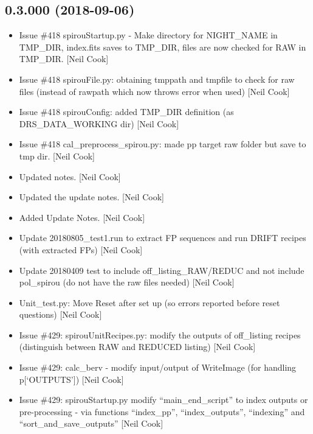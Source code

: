 \documentclass[a4paper,10pt,english]{report}
\begin{document}
\subsection{0.3.000 (2018-09-06)}
\label{\detokenize{misc/changelog:id332}}\begin{itemize}
\item {} 
Issue \#418 spirouStartup.py - Make directory for NIGHT\_NAME in
TMP\_DIR, index.fits saves to TMP\_DIR, files are now checked for RAW in
TMP\_DIR. {[}Neil Cook{]}

\item {} 
Issue \#418 spirouFile.py: obtaining tmppath and tmpfile to check for
raw files (instead of rawpath which now throws error when used) {[}Neil
Cook{]}

\item {} 
Issue \#418 spirouConfig: added TMP\_DIR definition (as DRS\_DATA\_WORKING
dir) {[}Neil Cook{]}

\item {} 
Issue \#418 cal\_preprocess\_spirou.py: made pp target raw folder but
save to tmp dir. {[}Neil Cook{]}

\item {} 
Updated notes. {[}Neil Cook{]}

\item {} 
Updated the update notes. {[}Neil Cook{]}

\item {} 
Added Update Notes. {[}Neil Cook{]}

\item {} 
Update 20180805\_test1.run to extract FP sequences and run DRIFT
recipes (with extracted FPs) {[}Neil Cook{]}

\item {} 
Update 20180409 test to include off\_listing\_RAW/REDUC and not include
pol\_spirou (do not have the raw files needed) {[}Neil Cook{]}

\item {} 
Unit\_test.py: Move Reset after set up (so errors reported before reset
questions) {[}Neil Cook{]}

\item {} 
Issue \#429: spirouUnitRecipes.py: modify the outputs of off\_listing
recipes (distinguish between RAW and REDUCED listing) {[}Neil Cook{]}

\item {} 
Issue \#429: calc\_berv - modify input/output of WriteImage (for
handling p{[}‘OUTPUTS’{]}) {[}Neil Cook{]}

\item {} 
Issue \#429: spirouStartup.py modify “main\_end\_script” to index outputs
or pre-processing - via functions “index\_pp”, “index\_outputs”,
“indexing” and “sort\_and\_save\_outputs” {[}Neil Cook{]}


\end{itemize}
\end{document}
